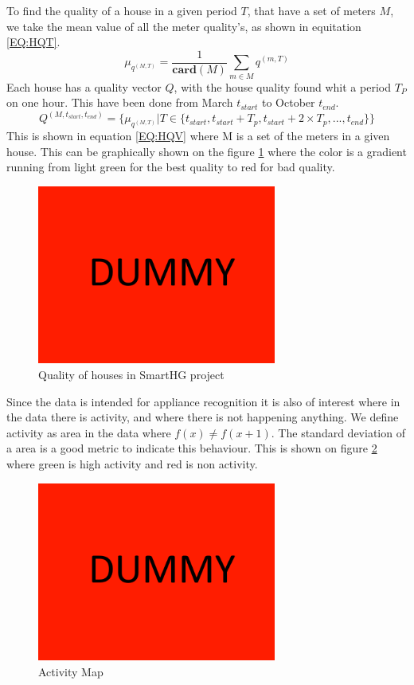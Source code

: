 To find the quality of a house in a given period $T$, that have a set of meters $M$, we take the mean value of all the meter quality's, as shown in equitation \ref{EQ:HQT}.  
\begin{equation}
	\mu_{q^{(M,T)}} = \frac{1}{\mathbf{card}(M)} \sum_{m \in M} q^{(m,T)}
	\label{EQ:HQT}
\end{equation}
Each house has a quality vector $Q$, with the house quality found whit a period $T_P$ on one hour. This have been done from March $t_{start}$ to October $t_{end}$. 
\begin{equation}
	Q^{(M,t_{start},t_{end} )} = \{ \mu_{q^{(M,T)}} | T \in \{t_{start}, t_{start}+T_p,t_{start}+2 \times T_p, ... , t_{end}  \} \}
	\label{EQ:HQV}
\end{equation}
This is shown in equation \ref{EQ:HQV} where M is a set of the meters in a given house. This can be graphically shown on the figure \ref{fig:SmartHGQuality} where the color is a gradient running from light green for the best quality to red for bad quality.
\begin{figure}[H]
\centering
\includegraphics[width=0.7\textwidth]{billeder/DUMMY.png}
\caption{Quality of houses in SmartHG project }
\label{fig:SmartHGQuality}
\end{figure} 
Since the data is intended for appliance recognition it is also of interest where in the data there is activity, and where there is not happening anything. We define activity as area in the data where $f(x) \neq f(x+1) $. The standard deviation of a area is a good metric to indicate this behaviour. This is shown on figure \ref{fig:ActivityMap} where green is high activity and red is non activity. 
\begin{figure}[H]
\centering
\includegraphics[width=0.7\textwidth]{billeder/DUMMY.png}
\caption{Activity Map }
\label{fig:ActivityMap}
\end{figure}
